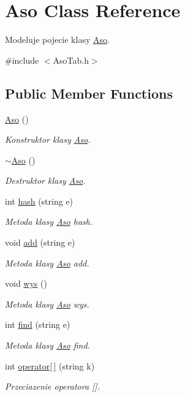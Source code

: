 \hypertarget{class_aso}{\section{Aso Class Reference}
\label{class_aso}
}


Modeluje pojecie klasy \hyperlink{class_aso}{Aso}.  




{\ttfamily \#include $<$Aso\-Tab.\-h$>$}

\subsection*{Public Member Functions}
\begin{DoxyCompactItemize}
\item 
\hyperlink{class_aso_aa6139dad47a972c170dea9a88feaa529}{Aso} ()
\begin{DoxyCompactList}\small\item\em Konstruktor klasy \hyperlink{class_aso}{Aso}. \end{DoxyCompactList}\item 
\hyperlink{class_aso_ad7482e069ac0c61f04d4d71c3a70a288}{$\sim$\-Aso} ()
\begin{DoxyCompactList}\small\item\em Destruktor klasy \hyperlink{class_aso}{Aso}. \end{DoxyCompactList}\item 
int \hyperlink{class_aso_ad70b0f94ac78b5c6b1321185c6bf423c}{hash} (string e)
\begin{DoxyCompactList}\small\item\em Metoda klasy \hyperlink{class_aso}{Aso} hash. \end{DoxyCompactList}\item 
void \hyperlink{class_aso_a9d642c8aa6f9d83d1f6e0d246d051ae9}{add} (string e)
\begin{DoxyCompactList}\small\item\em Metoda klasy \hyperlink{class_aso}{Aso} add. \end{DoxyCompactList}\item 
void \hyperlink{class_aso_a141e1ddfc0d92607a6676c32579c9ceb}{wys} ()
\begin{DoxyCompactList}\small\item\em Metoda klasy \hyperlink{class_aso}{Aso} wys. \end{DoxyCompactList}\item 
int \hyperlink{class_aso_a913713c043e77f824eb68dbf7d01260a}{find} (string e)
\begin{DoxyCompactList}\small\item\em Metoda klasy \hyperlink{class_aso}{Aso} find. \end{DoxyCompactList}\item 
int \hyperlink{class_aso_ad933eef7b2932620a027feedde11d231}{operator\mbox{[}$\,$\mbox{]}} (string k)
\begin{DoxyCompactList}\small\item\em Przeciazenie operatora \mbox{[}\mbox{]}. \end{DoxyCompactList}\end{DoxyCompactItemize}


